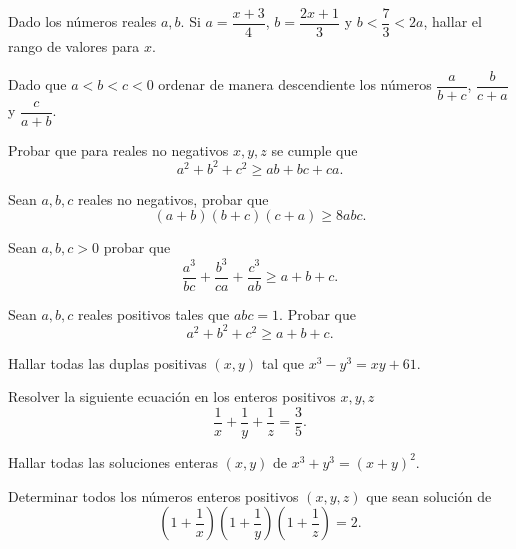 \begin{exercise}
    Dado los números reales $a,b$.
    Si $a = \dfrac{x + 3}{4}$, $b = \dfrac{2x + 1}{3}$ y $b < \dfrac{7}{3} < 2a$, hallar el rango de valores para $x$.
\end{exercise}

\begin{exercise}
    Dado que $a < b < c < 0$ ordenar de manera descendiente los números $\dfrac{a}{b + c}$, $\dfrac{b}{c + a}$ y $\dfrac{c}{a + b}$.
\end{exercise}

\begin{exercise}
    Probar que para reales no negativos $x,y,z$ se cumple que
    \[
        a^2 + b^2 + c^2 \geq ab + bc + ca.
    \]
\end{exercise}

\begin{exercise}
    Sean $a,b,c$ reales no negativos, probar que
    \[
        (a + b)(b + c)(c + a) \geq 8abc.
    \]
\end{exercise}

\begin{exercise}
    Sean $a,b,c > 0$ probar que
    \[
        \frac{a^3}{bc} + \frac{b^3}{ca} + \frac{c^3}{ab} \geq a + b + c.
    \]
\end{exercise}

\begin{exercise}
    Sean $a,b,c$ reales positivos tales que $abc = 1$.
    Probar que
    \[
        a^2 + b^2 + c^2 \geq a + b + c.
    \]
\end{exercise}

\begin{exercise}
    Hallar todas las duplas positivas $(x,y)$ tal que $x^3 - y^3 = xy + 61$.
\end{exercise}

\begin{exercise}
    Resolver la siguiente ecuación en los enteros positivos $x,y,z$
    \[
        \frac{1}{x} + \frac{1}{y} + \frac{1}{z} = \frac{3}{5}.
    \]
\end{exercise}

\begin{exercise}
    Hallar todas las soluciones enteras $(x,y)$ de $x^3 + y^3 = (x + y)^2$.
\end{exercise}

\begin{exercise}
    Determinar todos los números enteros positivos $(x,y,z)$ que sean solución de
    \[
        \left(1 + \dfrac{1}{x}\right)\left(1 + \dfrac{1}{y}\right)\left(1 + \dfrac{1}{z}\right) = 2.
    \]
\end{exercise}

